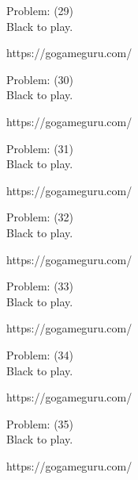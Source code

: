 \documentclass[11pt]{article}
\begin{document}
\begin{minipage}[t]{0.5\textwidth}
  {\centering
  
  Problem: (29)\\
  Black to play.

https://gogameguru.com/\\
  }
\end{minipage}
\begin{minipage}[t]{0.5\textwidth}
  {\centering
  
  Problem: (30)\\
  Black to play.

https://gogameguru.com/\\
  }
\end{minipage}
\begin{minipage}[t]{0.5\textwidth}
  {\centering
  
  Problem: (31)\\
  Black to play.

https://gogameguru.com/\\
  }
\end{minipage}
\begin{minipage}[t]{0.5\textwidth}
  {\centering
  
  Problem: (32)\\
  Black to play.

https://gogameguru.com/\\
  }
\end{minipage}
\begin{minipage}[t]{0.5\textwidth}
  {\centering
  
  Problem: (33)\\
  Black to play.

https://gogameguru.com/\\
  }
\end{minipage}
\begin{minipage}[t]{0.5\textwidth}
  {\centering
  
  Problem: (34)\\
  Black to play.

https://gogameguru.com/\\
  }
\end{minipage}
\begin{minipage}[t]{0.5\textwidth}
  {\centering
  
  Problem: (35)\\
  Black to play.

https://gogameguru.com/\\
  }
\end{minipage}
\end{document}
